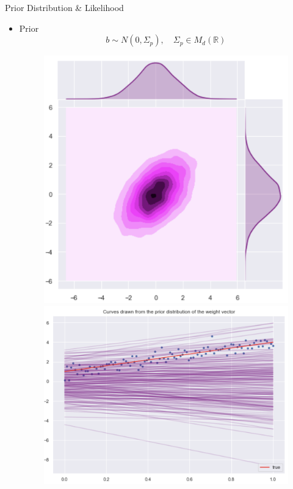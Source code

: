 \documentclass[10pt]{beamer}
\begin{document}
\begin{frame}{Prior Distribution \& Likelihood}
\begin{itemize}
\item Prior 
$$
b \sim N(0, \Sigma_p), \quad  \Sigma_p \in M_{d}(\mathbb{R})
$$
\begin{center}
\begin{figure}
\includegraphics[scale=0.17]{images/lin_join_prior.png} 
\includegraphics[scale=0.17]{images/prior_lin_mod_param_distr.png} 

\end{figure}
\end{center}
\end{itemize}
\end{frame}
\end{document}
